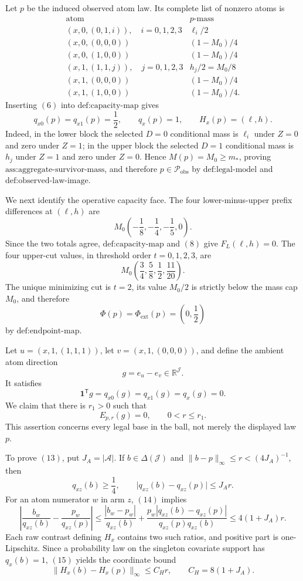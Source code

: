 Let \(p\) be the induced observed atom law.  Its complete list of nonzero atoms is
\[
\begin{array}{c|c}
\text{atom}&p\text{-mass}\\ \hline
(x,0,(0,1,i)),\quad i=0,1,2,3&\ell_i/2\\
(x,0,(0,0,0))&(1-M_0)/4\\
(x,0,(1,0,0))&(1-M_0)/4\\
(x,1,(1,1,j)),\quad j=0,1,2,3&h_j/2=M_0/8\\
(x,1,(0,0,0))&(1-M_0)/4\\
(x,1,(1,0,0))&(1-M_0)/4.
\end{array}
\tag{6}
\]
Inserting \((6)\) into \(\text{def:capacity-map}\) gives
\[
 q_{x0}(p)=q_{x1}(p)=\frac12,\qquad q_x(p)=1,
 \qquad H_x(p)=(\ell,h).
\tag{7}
\]
Indeed, in the lower block the selected \(D=0\) conditional mass is \(\ell_i\) under \(Z=0\) and zero under \(Z=1\); in the upper block the selected \(D=1\) conditional mass is \(h_j\) under \(Z=1\) and zero under \(Z=0\).  Hence \(M(p)=M_0\ge m_*\), proving \(\text{ass:aggregate-survivor-mass}\), and therefore \(p\in\mathcal P_{\mathrm{obs}}\) by \(\text{def:legal-model}\) and \(\text{def:observed-law-image}\).

We next identify the operative capacity face.  The four lower-minus-upper prefix differences at \((\ell,h)\) are
\[
 M_0\left(-\frac18,-\frac14,-\frac15,0\right).
\tag{8}
\]
Since the two totals agree, \(\text{def:capacity-map}\) and \((8)\) give \(F_L(\ell,h)=0\).  The four upper-cut values, in threshold order \(t=0,1,2,3\), are
\[
 M_0\left(\frac34,\frac58,\frac12,\frac{11}{20}\right).
\tag{9}
\]
The unique minimizing cut is \(t=2\), its value \(M_0/2\) is strictly below the mass cap \(M_0\), and therefore
\[
 \Phi(p)=\Phi_{\mathrm{ext}}(p)=\left(0,\frac12\right)
\tag{10}
\]
by \(\text{def:endpoint-map}\).

Let \(u=(x,1,(1,1,1))\), let \(v=(x,1,(0,0,0))\), and define the ambient atom direction
\[
 g=e_u-e_v\in\mathbb R^{\mathcal J}.
\tag{11}
\]
It satisfies
\[
 \mathbf 1^{\mathsf T}g=q_{x0}(g)=q_{x1}(g)=q_x(g)=0.
\tag{12}
\]
We claim that there is \(r_1>0\) such that
\[
 E_{p,r}(g)=0,\qquad 0<r\le r_1.
\tag{13}
\]
This assertion concerns every legal base in the ball, not merely the displayed law \(p\).

To prove \((13)\), put \(J_A=\lvert\mathcal A\rvert\).  If \(b\in\Delta(\mathcal J)\) and \(\lVert b-p\rVert_\infty\le r<(4J_A)^{-1}\), then
\[
 q_{xz}(b)\ge\frac14,
 \qquad
 \lvert q_{xz}(b)-q_{xz}(p)\rvert\le J_A r.
\tag{14}
\]
For an atom numerator \(w\) in arm \(z\), \((14)\) implies
\[
 \left|\frac{b_w}{q_{xz}(b)}-\frac{p_w}{q_{xz}(p)}\right|
 \le \frac{|b_w-p_w|}{q_{xz}(b)}
 +\frac{p_w|q_{xz}(b)-q_{xz}(p)|}{q_{xz}(p)q_{xz}(b)}
 \le4(1+J_A)r.
\tag{15}
\]
Each raw contrast defining \(H_x\) contains two such ratios, and positive part is one-Lipschitz.  Since a probability law on the singleton covariate support has \(q_x(b)=1\), \((15)\) yields the coordinate bound
\[
 \lVert H_x(b)-H_x(p)\rVert_\infty\le C_Hr,
 \qquad C_H=8(1+J_A).
\tag{16}
\]

